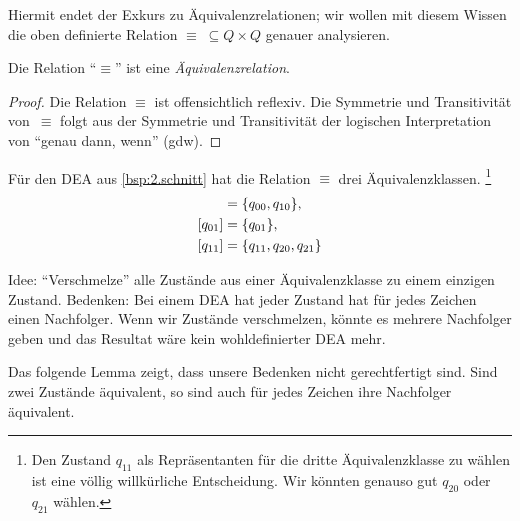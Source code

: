 Hiermit endet der Exkurs zu Äquivalenzrelationen; wir wollen mit diesem Wissen die oben definierte Relation $\equiv\; \subseteq Q\times Q$ genauer analysieren.

\begin{lemma}[name={[$\equiv$ ist Äquivalenzrelation]}] %
        Die Relation "`$\equiv$"' ist eine \emph{Äquivalenzrelation}.
\end{lemma}
\begin{proof}

  Die Relation $\equiv$ ist offensichtlich reflexiv.
  Die Symmetrie und Transitivität von~$\equiv$ folgt aus der Symmetrie und Transitivität der logischen Interpretation von "`genau dann, wenn"' (gdw).
\end{proof}


\begin{Bsp} 
Für den \ac{DEA} aus \autoref{bsp:2.schnitt} hat die Relation $\equiv$ drei Äquivalenzklassen.%
\footnote{Den Zustand $q_{11}$ als Repräsentanten für die dritte Äquivalenzklasse zu wählen ist eine völlig willkürliche Entscheidung. 
Wir könnten genauso gut $q_{20}$ oder $q_{21}$ wählen.}
\begin{align*}
 [q_{00}] & = \{q_{00}, q_{10}\},\\
 [q_{01}] & = \{q_{01}\},\\
 [q_{11}] & = \{q_{11}, q_{20}, q_{21}\}
 \qedhere
\end{align*}
\end{Bsp}





Idee: "`Verschmelze"' alle Zustände aus einer Äquivalenzklasse zu einem einzigen Zustand.
Bedenken: Bei einem \ac{DEA} hat jeder Zustand hat für jedes Zeichen einen Nachfolger. 
Wenn wir Zustände verschmelzen, könnte es mehrere Nachfolger geben und das Resultat wäre kein wohldefinierter \ac{DEA} mehr.

Das folgende Lemma zeigt, dass unsere Bedenken nicht gerechtfertigt sind. 
Sind zwei Zustände äquivalent, so sind auch für jedes Zeichen ihre Nachfolger äquivalent.


